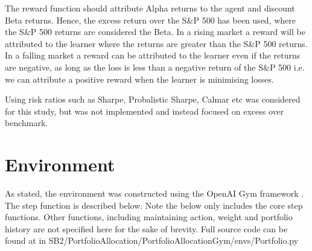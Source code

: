 \documentclass[oneside,12pt]{Classes/RoboticsLaTeX}
\begin{document}
The reward function should attribute Alpha returns to the agent and discount Beta returns. Hence, the excess return over the S\&P 500 has been used, where the S\&P 500 returns are considered the Beta. In a rising market a reward will be attributed to the learner where the returns are greater than the S\&P 500 returns. In a falling market a reward can be attributed to the learner even if the returns are negative, as long as the loss is less than a negative return of the S\&P 500 i.e. we can attribute a positive reward when the learner is minimising losses. 

Using risk ratios such as Sharpe, Probalistic Sharpe, Calmar etc was considered for this study, but was not implemented and instead focused on excess over benchmark.

\section{Environment}
As stated, the environment was constructed using the  OpenAI Gym framework \citet{1606.01540}.  The step function is described below. Note the below only includes the core step functions. Other functions, including maintaining action, weight and portfolio history are not specified here for the sake of brevity. Full source code can be found at \citet{KeithBinesThesis2021} in \newline SB2/PortfolioAllocation/PortfolioAllocationGym/envs/Portfolio.py 
\end{document}
